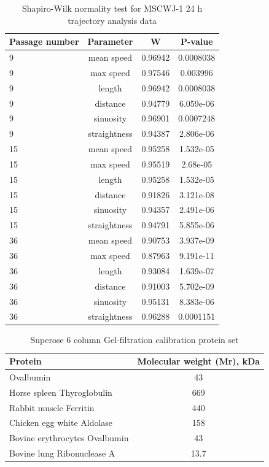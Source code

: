 \documentclass[num-refs]{wiley-article}
\begin{document}
\begin{table}[hbt!]
  \caption{Shapiro-Wilk normality test for MSCWJ-1 24 h trajectory analysis data}
\centering
\begin{tabular}{l|ccc}
    \hline
 Passage number & Parameter & W & P-value \\
   \hline
9 & mean speed & 0.96942 & 0.0008038 \\
9 & max speed & 0.97546 &  0.003996 \\
9 & length & 0.96942 & 0.0008038 \\
9 & distance & 0.94779 & 6.059e-06 \\
9 & sinuosity & 0.96901 & 0.0007248 \\
9 & straightness & 0.94387 & 2.806e-06 \\
15 & mean speed & 0.95258 & 1.532e-05 \\
15 & max speed & 0.95519 &  2.68e-05 \\
15 & length & 0.95258 & 1.532e-05 \\
15 & distance & 0.91826 & 3.121e-08 \\
15 & sinuosity & 0.94357 & 2.491e-06 \\
15 & straightness & 0.94791 & 5.855e-06 \\
36 & mean speed & 0.90753 & 3.937e-09 \\
36 & max speed & 0.87963 &  9.191e-11 \\
36 & length & 0.93084 & 1.639e-07 \\
36 & distance & 0.91003 & 5.702e-09 \\
36 & sinuosity & 0.95131 & 8.383e-06 \\
36 & straightness & 0.96288 & 0.0001151
\end{tabular}
\end{table}

\begin{table}[hbt!]
  \caption{Superose 6 column Gel-filtration calibration protein set}
  \label{calibration}
\centering
\begin{tabular}{l|c|}
 Protein & Molecular weight (Mr), kDa  \\
 \hline
 Ovalbumin & 43 \\
 Horse spleen Thyroglobulin & 669 \\
 Rabbit muscle Ferritin & 440 \\
 Chicken egg white Aldolase & 158 \\
 Bovine erythrocytes Ovalbumin & 43 \\
 Bovine lung Ribonuclease A & 13.7
\end{tabular}
\begin{tablenotes}
\item
\end{tablenotes}
\end{table}
\end{document}
